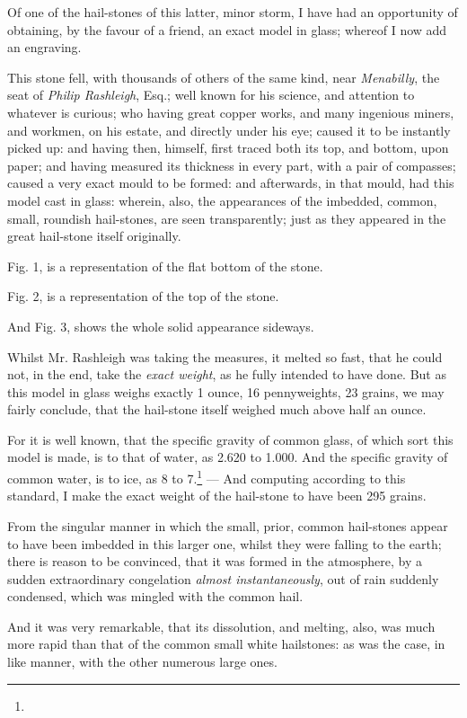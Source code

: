 \documentclass[a4paper, 12pt, oneside, twocolumn]{article}
\begin{document}
Of one of the hail-stones of this latter, minor storm, I have had an opportunity of obtaining, by the favour of a friend, an exact model in glass; whereof I now add an engraving.

This stone fell, with thousands of others of the same kind, near \emph{Menabilly}, the seat of \emph{Philip Rashleigh}, Esq.; well known for his science, and attention to whatever is curious; who having great copper works, and many ingenious miners, and workmen, on his estate, and directly under his eye; caused it to be instantly picked up: and having then, himself, first traced both its top, and bottom, upon paper; and having measured its thickness in every part, with a pair of compasses; caused a very exact mould to be formed: and afterwards, in that mould, had this model cast in glass: wherein, also, the appearances of the imbedded, common, small, roundish hail-stones, are seen transparently; just as they appeared in the great hail-stone itself originally.

Fig. 1, is a representation of the flat bottom of the stone.

Fig. 2, is a representation of the top of the stone.

And Fig. 3, shows the whole solid appearance sideways.

Whilst Mr. Rashleigh was taking the measures, it melted so fast, that he could not, in the end, take the \emph{exact weight}, as he fully intended to have done. But as this model in glass weighs exactly 1 ounce, 16 pennyweights, 23 grains, we may fairly conclude, that the hail-stone itself weighed much above half an ounce.

For it is well known, that the specific gravity of common glass, of which sort this model is made, is to that of water, as 2.620 to 1.000. And the specific gravity of common water, is to ice, as 8 to 7.\footnote{} --- And computing according to this standard, I make the exact weight of the hail-stone to have been 295 grains.

From the singular manner in which the small, prior, common hail-stones appear to have been imbedded in this larger one, whilst they were falling to the earth; there is reason to be convinced, that it was formed in the atmosphere, by a sudden extraordinary congelation \emph{almost instantaneously}, out of rain suddenly condensed, which was mingled with the common hail.

And it was very remarkable, that its dissolution, and melting, also, was much more rapid than that of the common small white hailstones: as was the case, in like manner, with the other numerous large ones.
\end{document}
